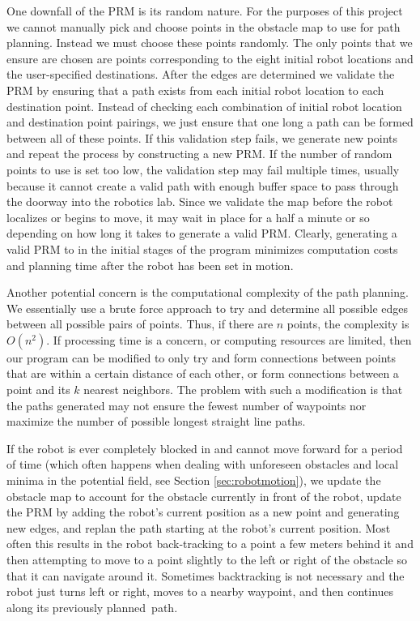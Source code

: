 \documentclass[12pt]{article}
\begin{document}
One downfall of the PRM is its random nature. For the purposes of this project we cannot manually pick and choose points in the obstacle map to use for path planning. Instead we must choose these points randomly. The only points that we ensure are chosen are points corresponding to the eight initial robot locations and the user-specified destinations. After the edges are determined we validate the PRM by ensuring that a path exists from each initial robot location to each destination point. Instead of checking each combination of initial robot location and destination point pairings, we just ensure that one long a path can be formed between all of these points. If this validation step fails, we generate new points and repeat the process by constructing a new PRM. If the number of random points to use is set too low, the validation step may fail multiple times, usually because it cannot create a valid path with enough buffer space to pass through the doorway into the robotics lab. Since we validate the map before the robot localizes or begins to move, it may wait in place for a half a minute or so depending on how long it takes to generate a valid PRM. Clearly, generating a valid PRM to in the initial stages of the program minimizes computation costs and planning time after the robot has been set in motion.

Another potential concern is the computational complexity of the path planning. We essentially use a brute force approach to try and determine all possible edges between all possible pairs of points. Thus, if there are $n$ points, the complexity is $O(n^2)$. If processing time is a concern, or computing resources are limited, then our program can be modified to only try and form connections between points that are within a certain distance of each other, or form connections between a point and its $k$ nearest neighbors. The problem with such a modification is that the paths generated may not ensure the fewest number of waypoints nor maximize the number of possible longest straight line paths.

If the robot is ever completely blocked in and cannot move forward for a period of time (which often happens when dealing with unforeseen obstacles and local minima in the potential field, see Section \ref{sec:robotmotion}), we update the obstacle map to account for the obstacle currently in front of the robot, update the PRM by adding the robot's current position as a new point and generating new edges, and replan the path starting at the robot's current position. Most often this results in the robot back-tracking to a point a few meters behind it and then attempting to move to a point slightly to the left or right of the obstacle so that it can navigate around it. Sometimes backtracking is not necessary and the robot just turns left or right, moves to a nearby waypoint, and then continues along its previously planned~path.
\end{document}
